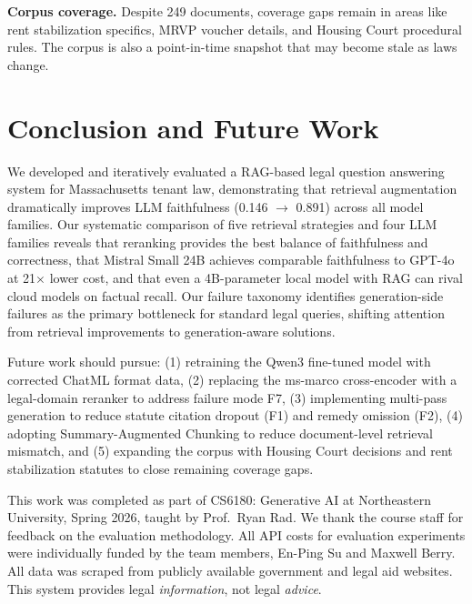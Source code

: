 \documentclass{article}
\begin{document}
\textbf{Corpus coverage.} Despite 249 documents, coverage gaps remain in areas like rent stabilization specifics, MRVP voucher details, and Housing Court procedural rules. The corpus is also a point-in-time snapshot that may become stale as laws change.

\section{Conclusion and Future Work}
\label{sec:conclusion}

We developed and iteratively evaluated a RAG-based legal question answering system for Massachusetts tenant law, demonstrating that retrieval augmentation dramatically improves LLM faithfulness (0.146 $\rightarrow$ 0.891) across all model families. Our systematic comparison of five retrieval strategies and four LLM families reveals that reranking provides the best balance of faithfulness and correctness, that Mistral Small 24B achieves comparable faithfulness to GPT-4o at 21$\times$ lower cost, and that even a 4B-parameter local model with RAG can rival cloud models on factual recall. Our failure taxonomy identifies generation-side failures as the primary bottleneck for standard legal queries, shifting attention from retrieval improvements to generation-aware solutions.

Future work should pursue: (1) retraining the Qwen3 fine-tuned model with corrected ChatML format data, (2) replacing the ms-marco cross-encoder with a legal-domain reranker to address failure mode F7, (3) implementing multi-pass generation to reduce statute citation dropout (F1) and remedy omission (F2), (4) adopting Summary-Augmented Chunking \citep{nllp2025reliable} to reduce document-level retrieval mismatch, and (5) expanding the corpus with Housing Court decisions and rent stabilization statutes to close remaining coverage gaps.


\begin{ack}
This work was completed as part of CS6180: Generative AI at Northeastern University, Spring 2026, taught by Prof.\ Ryan Rad. We thank the course staff for feedback on the evaluation methodology. All API costs for evaluation experiments were individually funded by the team members, En-Ping Su and Maxwell Berry. All data was scraped from publicly available government and legal aid websites. This system provides legal \emph{information}, not legal \emph{advice}.
\end{ack}
\end{document}
